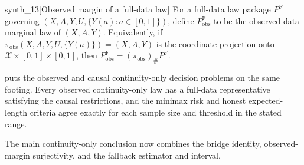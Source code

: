 \documentclass[11pt]{article}
\begin{document}
\begin{definitionv}{synth_13}[Observed margin of a full-data law]
For a full-data law package $P^{\mathrm F}$ governing $(X,A,Y,U,\{Y(a):a\in[0,1]\})$, define $P^{\mathrm F}_{\mathrm{obs}}$ to be the observed-data marginal law of $(X,A,Y)$. Equivalently, if $\pi_{\mathrm{obs}}(X,A,Y,U,\{Y(a)\})=(X,A,Y)$ is the coordinate projection onto $\mathcal X\times[0,1]\times[0,1]$, then $P^{\mathrm F}_{\mathrm{obs}}=(\pi_{\mathrm{obs}})_{\#}P^{\mathrm F}$.
\end{definitionv}

 puts the observed and causal continuity-only decision problems on the same footing. Every observed continuity-only law has a full-data representative satisfying the causal restrictions, and the minimax risk and honest expected-length criteria agree exactly for each sample size and threshold in the stated range.

The main continuity-only conclusion now combines the bridge identity, observed-margin surjectivity, and the fallback estimator and interval.
\end{document}
